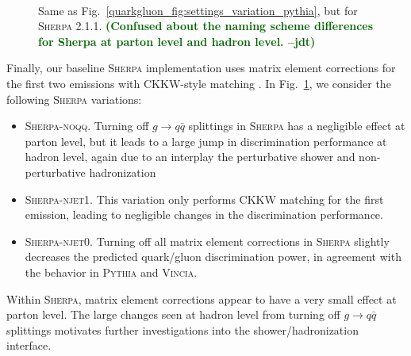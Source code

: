 \documentclass[11pt]{cernrep}
\newcommand{\jdt}[1]{\textbf{\textcolor{darkgreen}{(#1 --jdt)}}}
\begin{document}
\begin{figure}
\centering
{}
$\qquad$
\caption{Same as Fig.~\ref{quarkgluon_fig:settings_variation_pythia}, but for \textsc{Sherpa 2.1.1}. \jdt{Confused about the naming scheme differences for Sherpa at parton level and hadron level.}}
\label{quarkgluon_fig:settings_variation_sherpa}
\end{figure}

Finally, our baseline \textsc{Sherpa} implementation uses matrix element corrections for the first two emissions with CKKW-style matching \cite{Catani:2001cc}.  In Fig.~\ref{quarkgluon_fig:settings_variation_sherpa}, we consider the following \textsc{Sherpa} variations:
\begin{itemize}
\item \textsc{Sherpa-noqq}.  Turning off $g \to q \bar{q}$ splittings in \textsc{Sherpa} has a negligible effect at parton level, but it leads to a large jump in discrimination performance at hadron level, again due to an interplay the perturbative shower and non-perturbative hadronization
\item \textsc{Sherpa-njet1}.  This variation only performs CKKW matching for the first emission, leading to negligible changes in the discrimination performance.
\item \textsc{Sherpa-njet0}.  Turning off all matrix element corrections in \textsc{Sherpa} slightly decreases the predicted quark/gluon discrimination power, in agreement with the behavior in \textsc{Pythia} and \textsc{Vincia}.
\end{itemize}
Within \textsc{Sherpa}, matrix element corrections appear to have a very small effect at parton level.  The large changes seen at hadron level from turning off $g \to q \bar{q}$ splittings motivates further investigations into the shower/hadronization interface.
\end{document}
